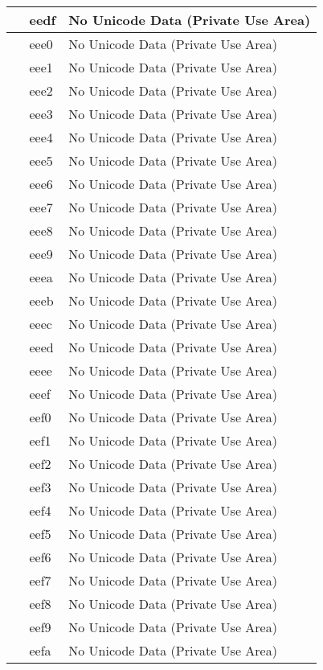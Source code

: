 \documentclass[12pt,letterpaper,openany]{book}
\begin{document}
\begin{center}
\begin{supertabular}{|m{0.25in}|m{0.5in}|m{4in}|}
 & eedf & No Unicode Data (Private Use Area)\\\hline
 & eee0 & No Unicode Data (Private Use Area)\\\hline
 & eee1 & No Unicode Data (Private Use Area)\\\hline
 & eee2 & No Unicode Data (Private Use Area)\\\hline
 & eee3 & No Unicode Data (Private Use Area)\\\hline
 & eee4 & No Unicode Data (Private Use Area)\\\hline
 & eee5 & No Unicode Data (Private Use Area)\\\hline
 & eee6 & No Unicode Data (Private Use Area)\\\hline
 & eee7 & No Unicode Data (Private Use Area)\\\hline
 & eee8 & No Unicode Data (Private Use Area)\\\hline
 & eee9 & No Unicode Data (Private Use Area)\\\hline
 & eeea & No Unicode Data (Private Use Area)\\\hline
 & eeeb & No Unicode Data (Private Use Area)\\\hline
 & eeec & No Unicode Data (Private Use Area)\\\hline
 & eeed & No Unicode Data (Private Use Area)\\\hline
 & eeee & No Unicode Data (Private Use Area)\\\hline
 & eeef & No Unicode Data (Private Use Area)\\\hline
 & eef0 & No Unicode Data (Private Use Area)\\\hline
 & eef1 & No Unicode Data (Private Use Area)\\\hline
 & eef2 & No Unicode Data (Private Use Area)\\\hline
 & eef3 & No Unicode Data (Private Use Area)\\\hline
 & eef4 & No Unicode Data (Private Use Area)\\\hline
 & eef5 & No Unicode Data (Private Use Area)\\\hline
 & eef6 & No Unicode Data (Private Use Area)\\\hline
 & eef7 & No Unicode Data (Private Use Area)\\\hline
 & eef8 & No Unicode Data (Private Use Area)\\\hline
 & eef9 & No Unicode Data (Private Use Area)\\\hline
 & eefa & No Unicode Data (Private Use Area)\\\hline

\end{supertabular}
\end{center}
\end{document}
